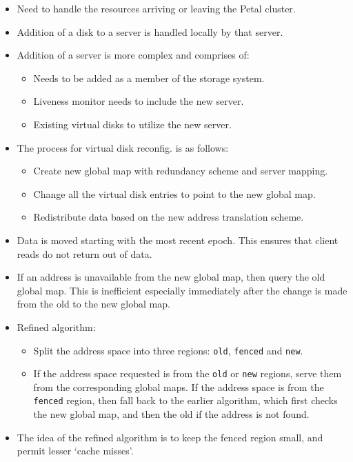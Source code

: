 \documentclass[parskip=half]{scrartcl}
\begin{document}
        \begin{itemize}
            \item 
            Need to handle the resources arriving or leaving the Petal cluster.
            \item 
            Addition of a disk to a server is handled locally by that server.
            \item 
            Addition of a server is more complex and comprises of:
            \begin{itemize}
                \item 
                Needs to be added as a member of the storage system.
                \item 
                Liveness monitor needs to include the new server.
                \item 
                Existing virtual disks to utilize the new server.
            \end{itemize}
            \item 
            The process for virtual disk reconfig. is as follows:
            \begin{itemize}
                \item 
                Create new global map with redundancy scheme and server mapping.
                \item 
                Change all the virtual disk entries to point to the new global map.
                \item 
                Redistribute data based on the new address translation scheme.
            \end{itemize}
            \item 
            Data is moved starting with the most recent epoch. This ensures that client reads do not return out of data.
            \item 
            If an address is unavailable from the new global map, then query the old global map. This is inefficient especially immediately after the change is made from the old to the new global map.
            \item 
            Refined algorithm:
            \begin{itemize}
                \item 
                Split the address space into three regions: \texttt{old}, \texttt{fenced} and \texttt{new}.
                \item 
                If the address space requested is from the \texttt{old} or \texttt{new} regions, serve them from the corresponding global maps. If the address space is from the \texttt{fenced} region, then fall back to the earlier algorithm, which first checks the new global map, and then the old if the address is not found.
            \end{itemize}
            \item 
            The idea of the refined algorithm is to keep the fenced region small, and permit lesser `cache misses'.
        \end{itemize}
    
\end{document}
